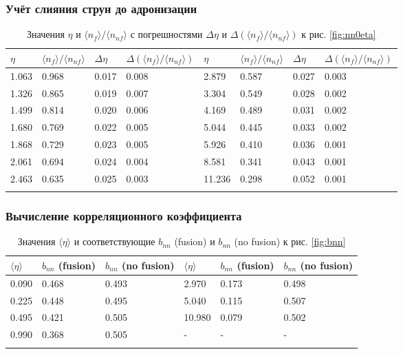 \subsubsection{Учёт слияния струн до адронизации}
{\scriptsize
\begin{longtable}{| l | l | l | l || l | l | l | l |}
	\hline
	$\eta$	&	$\langle n_{f} \rangle / \langle n_{nf} \rangle$	&	$\Delta \eta$	&	$\Delta (\langle n_{f} \rangle / \langle n_{nf} \rangle)$	&	$\eta$	&	$\langle n_{f} \rangle / \langle n_{nf} \rangle$	&	$\Delta \eta$	&	$\Delta (\langle n_{f} \rangle / \langle n_{nf} \rangle)$	\\
	\hline
	1.063	&	0.968	&	0.017	&	0.008	&	2.879	&	0.587	&	0.027	&	0.003	\\
	1.326	&	0.865	&	0.019	&	0.007	&	3.304	&	0.549	&	0.028	&	0.002	\\
	1.499	&	0.814	&	0.020	&	0.006	&	4.169	&	0.489	&	0.031	&	0.002	\\
	1.680	&	0.769	&	0.022	&	0.005	&	5.044	&	0.445	&	0.033	&	0.002	\\
	1.868	&	0.729	&	0.023	&	0.005	&	5.926	&	0.410	&	0.036	&	0.001	\\
	2.061	&	0.694	&	0.024	&	0.004	&	8.581	&	0.341	&	0.043	&	0.001	\\
	2.463	&	0.635	&	0.025	&	0.003	&	11.236	&	0.298	&	0.052	&	0.001	\\
	\hline
	\caption{Значения $\eta$ и $\langle n_{f} \rangle / \langle n_{nf} \rangle$ с погрешностями $\Delta \eta$ и $\Delta (\langle n_{f} \rangle / \langle n_{nf} \rangle)$ к рис. \ref{fig:nn0eta}} \label{tab:nn0eta}
\end{longtable}}

\subsubsection{Вычисление корреляционного коэффициента}
{\scriptsize
\begin{longtable}{| l | l | l || l | l | l |}
	\hline
	$\langle \eta \rangle$	&	$b_{nn}$ (fusion)	&	$b_{nn}$ (no fusion)	&	$\langle \eta \rangle$	&	$b_{nn}$ (fusion)	&	$b_{nn}$ (no fusion)	\\
	\hline
	0.090	&	0.468	&	0.493	&	2.970	&	0.173	&	0.498	\\
	0.225	&	0.448	&	0.495	&	5.040	&	0.115	&	0.507	\\
	0.495	&	0.421	&	0.505	&	10.980	&	0.079	&	0.502	\\
	0.990	&	0.368	&	0.505	&	-		&	-		&		-	\\
	\hline
	\caption{Значения $\langle \eta \rangle$ и соответствующие $b_{nn}$ (fusion) и $b_{nn}$ (no fusion) к рис. \ref{fig:bnn}} \label{tab:bnn}
\end{longtable}}

